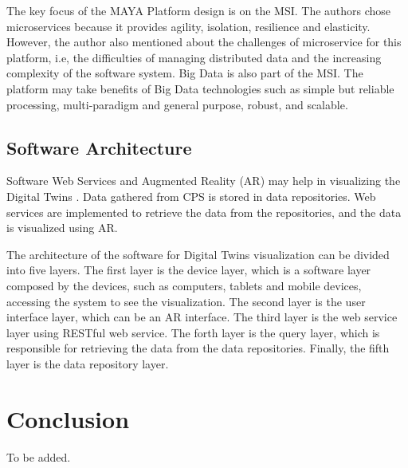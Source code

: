 \documentclass[article]{aaltoseries}
\begin{document}
The key focus of the MAYA Platform design is on the MSI. The authors chose microservices because it provides agility, isolation, resilience and elasticity. However, the author also mentioned about the challenges of microservice for this platform, i.e, the difficulties of managing distributed data and the increasing complexity of the software system. Big Data is also part of the MSI. The platform may take benefits of Big Data technologies such as simple but reliable processing, multi-paradigm and general purpose, robust, and scalable.

\subsection{Software Architecture}
Software Web Services and Augmented Reality (AR) may help in visualizing the Digital Twins \cite{schroeder2016visualising}. Data gathered from CPS is stored in data repositories. Web services are implemented to retrieve the data from the repositories, and the data is visualized using AR.

The architecture of the software for Digital Twins visualization can be divided into five layers. The first layer is the device layer, which is a software layer composed by the devices, such as computers, tablets and mobile devices, accessing the system to see the visualization. The second layer is the user interface layer, which can be an AR interface. The third layer is the web service layer using RESTful web service. The forth layer is the query layer, which is responsible for retrieving the data from the data repositories. Finally, the fifth layer is the data repository layer.




\section{Conclusion}

To be added.






\end{document}
